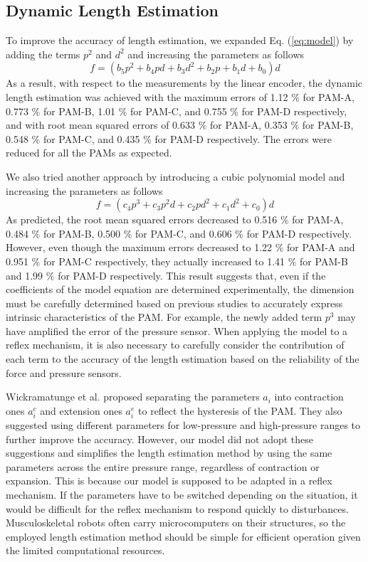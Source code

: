 \renewcommand{\thesubsection}{\Alph{subsection}}
\setcounter{subsection}{1} 
\subsection{Dynamic Length Estimation}
To improve the accuracy of length estimation, we expanded Eq. (\ref{eq:model}) by adding the terms $p^2$ and $d^2$ and increasing the parameters as follows
\begin{equation}
\label{eq:model_2d(1)}
f = (b_5p^2 + b_4pd + b_3d^2 + b_2p+b_1d+b_0)d
\end{equation}
As a result, with respect to the measurements by the linear encoder, the dynamic length estimation was achieved with the maximum errors of 1.12 $\%$ for PAM-A, 0.773 $\%$ for PAM-B, 1.01 $\%$ for PAM-C, and 0.755 $\%$ for PAM-D respectively, and with root mean squared errors of 0.633 $\%$ for PAM-A, 0.353 $\%$ for PAM-B, 0.548 $\%$ for PAM-C, and 0.435 $\%$ for PAM-D respectively. The errors were reduced for all the PAMs as expected. 

We also tried another approach by introducing a cubic polynomial model and increasing the parameters as follows
\begin{equation}
    \label{eq:model_3d}
    f = (c_4p^3+c_3p^2d+c_2pd^2+c_1d^2+c_0)d
\end{equation}
As predicted, the root mean squared errors decreased to 0.516 $\%$ for PAM-A, 0.484 $\%$ for PAM-B, 0.500 $\%$ for PAM-C, and 0.606 $\%$ for PAM-D respectively. 
However, even though the maximum errors decreased to 1.22 $\%$ for PAM-A and 0.951 $\%$ for PAM-C respectively, they actually increased to 1.41 $\%$ for PAM-B and 1.99 $\%$ for PAM-D respectively. This result suggests that, even if the coefficients of the model equation are determined experimentally, the dimension must be carefully determined based on previous studies to accurately express intrinsic characteristics of the PAM. For example, the newly added term $p^3$ may have amplified the error of the pressure sensor. When applying the model to a reflex mechanism, it is also necessary to carefully consider the contribution of each term to the accuracy of the length estimation based on the reliability of the force and pressure sensors.

Wickramatunge et al. proposed separating the parameters $a_i$ into contraction ones $a^c_i$ and extension ones $a^e_i$ to reflect the hysteresis of the PAM\cite{spring}. They also suggested using different parameters for low-pressure and high-pressure ranges to further improve the accuracy. However, our model did not adopt these suggestions and simplifies the length estimation method by using the same parameters across the entire pressure range, regardless of contraction or expansion. This is because our model is supposed to be adapted in a reflex mechanism. If the parameters have to be switched depending on the situation, it would be difficult for the reflex mechanism to respond quickly to disturbances. Musculoskeletal robots often carry microcomputers on their structures, so the employed length estimation method should be simple for efficient operation given the limited computational resources.

